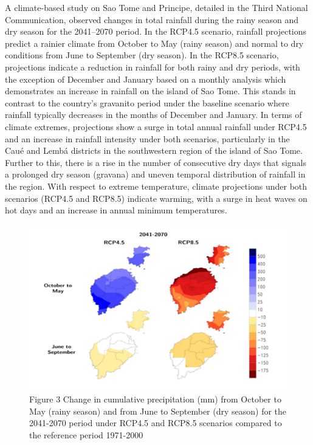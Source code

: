 \documentclass[
]{book}
\begin{document}
A climate-based study on Sao Tome and Principe, detailed in the Third National Communication, observed changes in total rainfall during the rainy season and dry season for the 2041--2070 period.
In the RCP4.5 scenario, rainfall projections predict a rainier climate from October to May (rainy season) and normal to dry conditions from June to September (dry season). In the RCP8.5 scenario, projections indicate a reduction in rainfall for both rainy and dry periods, with the exception of December and January based on a monthly analysis which demonstrates an increase in rainfall on the island of Sao Tome. This stands in contrast to the country's gravanito period under the baseline scenario where rainfall typically decreases in the months of December and January. In terms of climate extremes, projections show a surge in total annual rainfall under RCP4.5 and an increase in rainfall intensity under both scenarios, particularly in the Caué and Lembá districts in the southwestern region of the island of Sao Tome. Further to this, there is a rise in the number of consecutive dry days that signals a prolonged dry season (gravana) and uneven temporal distribution of rainfall in the region. With respect to extreme temperature, climate projections under both scenarios (RCP4.5 and RCP8.5) indicate warming, with a surge in heat waves on hot days and an increase in annual minimum temperatures.

\begin{figure}
\centering
\includegraphics{images/pr_proj.png}
\caption{Figure 3 Change in cumulative precipitation (mm) from October to May (rainy season) and from June to September (dry season) for the 2041-2070 period under RCP4.5 and RCP8.5 scenarios compared to the reference period 1971-2000}
\end{figure}
\end{document}

